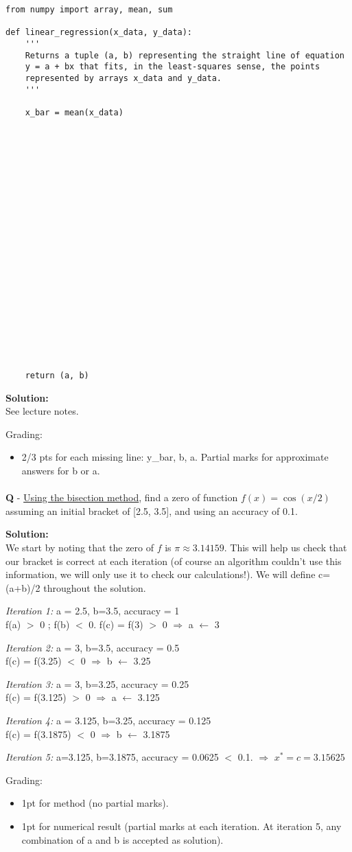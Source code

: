 \documentclass{llncs}
\newcounter{ques}
\renewcommand{\question}[1]{\paragraph{}\textbf{Q\theques} - #1\stepcounter{ques} }
\newcommand{\answer}[1]{\color{red}\textbf{Solution:}\\#1\color{black}}
\begin{document}
\begin{verbatim}
from numpy import array, mean, sum

def linear_regression(x_data, y_data):
    '''
    Returns a tuple (a, b) representing the straight line of equation
    y = a + bx that fits, in the least-squares sense, the points 
    represented by arrays x_data and y_data. 
    '''

    x_bar = mean(x_data)






















    return (a, b)

\end{verbatim}
\answer{See lecture notes. 

Grading:
\begin{itemize}
\item 2/3 pts for each missing line: y\_bar, b, a. Partial marks for approximate answers for b or a.
\end{itemize}
}



\newpage
\question{\underline{Using the bisection method}, find a zero of function $f(x)=\cos(x/2)$ assuming an initial bracket of [2.5, 3.5],
and using an accuracy of 0.1.}

\answer{
We start by noting that the zero of $f$ is $\pi \approx 3.14159$. This 
will help us check that our 
bracket is correct at each iteration (of course an algorithm couldn't use
this information, we will only use it to check our calculations!). We will define c=(a+b)/2 
throughout the solution.

\emph{Iteration 1:} a = 2.5, b=3.5, accuracy = 1\\
f(a) $>$ 0 ; f(b) $<$ 0.
f(c) = f(3) $>$ 0 $\Rightarrow$ a $\leftarrow$ 3

\emph{Iteration 2:} a = 3, b=3.5, accuracy = 0.5 \\
f(c) = f(3.25) $<$ 0 $\Rightarrow$ b $\leftarrow$ 3.25

\emph{Iteration 3:} a = 3, b=3.25, accuracy = 0.25\\
f(c) = f(3.125) $>$ 0 $\Rightarrow$ a $\leftarrow$ 3.125

\emph{Iteration 4:} a = 3.125, b=3.25, accuracy = 0.125\\
f(c) = f(3.1875) $<$ 0 $\Rightarrow$ b $\leftarrow$ 3.1875

\emph{Iteration 5:} a=3.125, b=3.1875, accuracy = 0.0625 $<$ 0.1.
$\Rightarrow$ $x^*=c=3.15625$

Grading:
\begin{itemize}
\item 1pt for method (no partial marks).
\item 1pt for numerical result (partial marks at each iteration. At iteration 5, any combination of a and b is accepted as solution).
\end{itemize}
}
\end{document}
